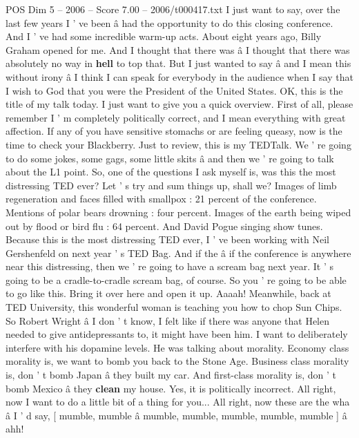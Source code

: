 \begin{textsample}{POS Dim 5 – 2006 – Score 7.00 – 2006/t000417.txt}  \label{ex:f5_pos_019}
I just want to say, over the last few years I ' ve been â had the opportunity to do this closing conference.
And I ' ve had some incredible warm-up acts.
About eight years ago, Billy Graham opened for me.
And I thought that there was â I thought that there was absolutely no way in \textbf{hell} to top that.
But I just wanted to say â and I mean this without irony â I think I can speak for everybody in the audience when I say that I wish to God that you were the President of the United States.
OK, this is the title of my talk today.
I just want to give you a quick overview.
First of all, please remember I ' m completely politically correct, and I mean everything with great affection.
If any of you have sensitive stomachs or are feeling queasy, now is the time to check your Blackberry.
Just to review, this is my TEDTalk.
We ' re going to do some jokes, some gags, some little skits â and then we ' re going to talk about the L1 point.
So, one of the questions I ask myself is, was this the most distressing TED ever?
Let ' s try and sum things up, shall we?
Images of limb regeneration and faces filled with smallpox : 21 percent of the conference.
Mentions of polar bears drowning : four percent.
Images of the earth being wiped out by flood or bird flu : 64 percent.
And David Pogue singing show tunes.
Because this is the most distressing TED ever, I ' ve been working with Neil Gershenfeld on next year ' s TED Bag.
And if the â if the conference is anywhere near this distressing, then we ' re going to have a scream bag next year.
It ' s going to be a cradle-to-cradle scream bag, of course.
So you ' re going to be able to go like this.
Bring it over here and open it up.
Aaaah!
Meanwhile, back at TED University, this wonderful woman is teaching you how to chop Sun Chips.
So Robert Wright â I don ' t know, I felt like if there was anyone that Helen needed to give antidepressants to, it might have been him.
I want to deliberately interfere with his dopamine levels.
He was talking about morality.
Economy class morality is, we want to bomb you back to the Stone Age.
Business class morality is, don ' t bomb Japan â they built my car.
And first-class morality is, don ' t bomb Mexico â they \textbf{clean} my house.
Yes, it is politically incorrect.
All right, now I want to do a little bit of a thing for you...
All right, now these are the wha â I ' d say, [ mumble, mumble â mumble, mumble, mumble, mumble, mumble ] â ahh!

\end{textsample}
